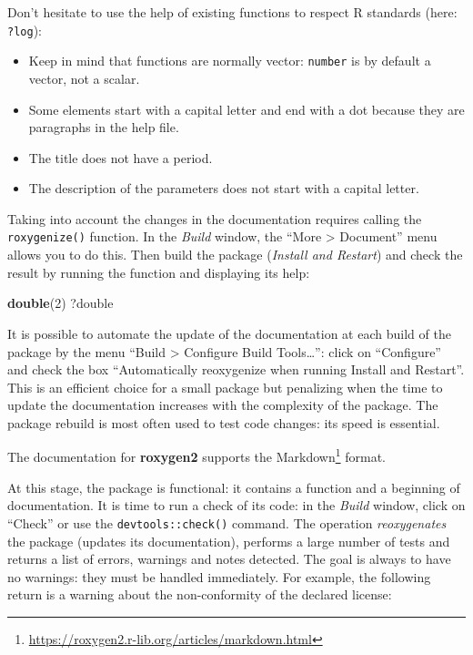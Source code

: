 \documentclass[
  12pt,
  american,
  a4paper,
  extrafontsizes,onecolumn,openright
  ]{memoir}
\newenvironment{Shaded}{\begin{snugshade}}{\end{snugshade}}
\newcommand{\DecValTok}[1]{\textcolor[rgb]{0.00,0.00,0.81}{#1}}
\newcommand{\FunctionTok}[1]{\textcolor[rgb]{0.13,0.29,0.53}{\textbf{#1}}}
\newcommand{\NormalTok}[1]{#1}
\providecommand{\tightlist}{%
  \setlength{\itemsep}{0pt}\setlength{\parskip}{0pt}}
\newlength{\rf}
\begin{document}
\normalsize

Don't hesitate to use the help of existing functions to respect R standards (here: \texttt{?log}):

\begin{itemize}
\tightlist
\item
  Keep in mind that functions are normally vector: \texttt{number} is by default a vector, not a scalar.
\item
  Some elements start with a capital letter and end with a dot because they are paragraphs in the help file.
\item
  The title does not have a period.
\item
  The description of the parameters does not start with a capital letter.
\end{itemize}

Taking into account the changes in the documentation requires calling the \texttt{roxygenize()} function.
In the \emph{Build} window, the \enquote{More \textgreater{} Document} menu allows you to do this.
Then build the package (\emph{Install and Restart}) and check the result by running the function and displaying its help:

\scriptsize

\begin{Shaded}
\begin{Highlighting}[]
\FunctionTok{double}\NormalTok{(}\DecValTok{2}\NormalTok{)}
\NormalTok{?double}
\end{Highlighting}
\end{Shaded}

\normalsize

It is possible to automate the update of the documentation at each build of the package by the menu \enquote{Build \textgreater{} Configure Build Tools\ldots{}}: click on \enquote{Configure} and check the box \enquote{Automatically reoxygenize when running Install and Restart}.
This is an efficient choice for a small package but penalizing when the time to update the documentation increases with the complexity of the package. The package rebuild is most often used to test code changes: its speed is essential.

The documentation for \textbf{roxygen2} supports the Markdown\footnote{\url{https://roxygen2.r-lib.org/articles/markdown.html}} format.

At this stage, the package is functional: it contains a function and a beginning of documentation.
It is time to run a check of its code: in the \emph{Build} window, click on \enquote{Check} or use the \texttt{devtools::check()} command.
The operation \emph{reoxygenates} the package (updates its documentation), performs a large number of tests and returns a list of errors, warnings and notes detected.
The goal is always to have no warnings: they must be handled immediately.
For example, the following return is a warning about the non-conformity of the declared license:
\end{document}
